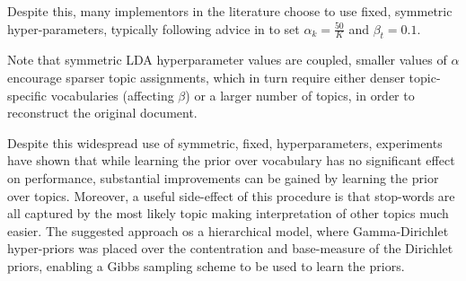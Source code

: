 Despite this, many implementors in the literature choose to use fixed, symmetric hyper-parameters, typically following advice in \cite{Griffiths2004} to set $\alpha_k = \frac{50}{K}$ and $\beta_t=0.1$. 

Note that symmetric LDA hyperparameter values are coupled, smaller values of $\alpha$ encourage sparser topic assignments, which in turn require either denser topic-specific vocabularies (affecting $\beta$) or a larger number of topics, in order to reconstruct the original document.


%

Despite this widespread use of symmetric, fixed, hyperparameters, experiments have shown\cite{Wallach2009a} that while learning the prior over vocabulary has no significant effect on performance, substantial improvements can be gained by learning the prior over topics. Moreover, a useful side-effect of this procedure is that stop-words are all captured by the most likely topic making interpretation of other topics much easier. The suggested approach os a hierarchical model, where Gamma-Dirichlet hyper-priors was placed over the contentration and base-measure of the Dirichlet priors, enabling a Gibbs sampling scheme to be used to learn the priors.












